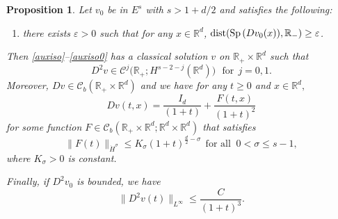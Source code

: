 \documentclass[11pt,twoside]{amsart}
\newtheorem{prop}{Proposition}[section]
\newcommand\R{\mathbb{R}}
\def\cC{{\mathcal C}}
\begin{document}
\begin{prop}
\label{p:Burgers}
Let $v_0$ be in $E^s$ with  $s>1+d/2$ and satisfies the following: 
\begin{enumerate}[label=$\bf (H0)$,leftmargin=1.5cm]
\item\label{spectral_gap} there exists  $\varepsilon>0$  such that for any   $x\in\R^d$, ${\rm dist}({\rm Sp}\,(Dv_0(x)),\R_-)\geq \varepsilon$. 
 \end{enumerate}
Then 
\eqref{auxiso}--\eqref{auxiso0} has a classical solution $v$ on $\R_+\times\R^d$ such that
\[
  D^2v \in \cC^j\bigl(\R_+;H^{s-2-j}(\R^d)\bigr)\ \ \ \mbox{for}\ \ j=0,1.
\]
Moreover,  $D  v\in \cC_b(\R_+\times\R^d)$ and we have for any $t\geq 0$ and  $x\in \R^d,$
\begin{equation}
\label{Du}
D  v(t,x)= \frac{I_d}{(1+t)} + \frac{F(t,x)}{(1+t)^2} 
\end{equation}
for some function $F\in\cC_b(\R_+\times\R^d;\R^d\times\R^d)$ that satisfies
\begin{equation}
\|F(t)\|_{\dot H^{\sigma}}\leq K_\sigma(1+t)^{\frac d2-\sigma}\ \ \mbox{for all }\ 0<\sigma\leq s-1,
\label{estim2}
\end{equation}
where $K_\sigma>0$ is constant. 

Finally, if $D^2v_0$ is bounded,  we have
\begin{equation}
{\displaystyle \|D^2  v(t)\|_{L^\infty}\leq \frac{C}{(1+t)^{3}}}.
\label{estim3}
\end{equation}
\end{prop}


\medbreak 
\end{document}
